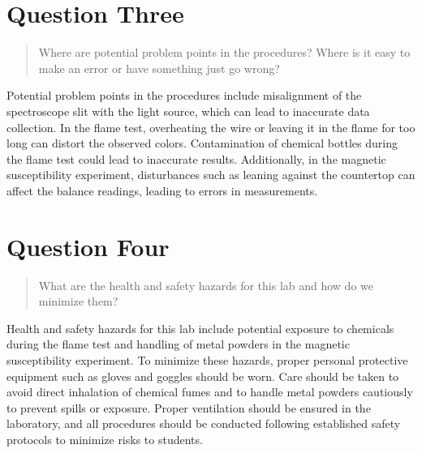 \documentclass[11pt, letterpaper]{article}
\begin{document}
\section{Question Three}
\begin{quote}
    Where are potential problem points in the procedures? Where is it easy to make an error
    or have something just go wrong?
\end{quote}

Potential problem points in the procedures include misalignment of the spectroscope
slit with the light source, which can lead to inaccurate data collection. In the
flame test, overheating the wire or leaving it in the flame for too long can distort
the observed colors. Contamination of chemical bottles during the flame test could
lead to inaccurate results. Additionally, in the magnetic susceptibility experiment,
disturbances such as leaning against the countertop can affect the balance readings,
leading to errors in measurements.


\section{Question Four}
\begin{quote}
    What are the health and safety hazards for this lab and how do we minimize them?
\end{quote}

Health and safety hazards for this lab include potential exposure to chemicals during
the flame test and handling of metal powders in the magnetic susceptibility experiment.
To minimize these hazards, proper personal protective equipment such as gloves and
goggles should be worn. Care should be taken to avoid direct inhalation of chemical
fumes and to handle metal powders cautiously to prevent spills or exposure. Proper
ventilation should be ensured in the laboratory, and all procedures should be conducted
following established safety protocols to minimize risks to students.
\end{document}

